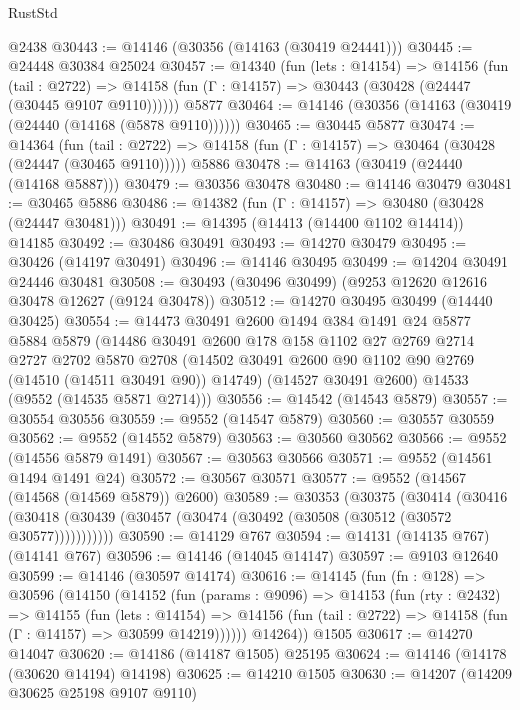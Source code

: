 \begin{lexlean}{RustStd}
\begin{coremodule}
    @2438
@30443 := @14146 (@30356 (@14163 (@30419 @24441)))
@30445 := @24448 @30384 @25024
@30457 := @14340
    (fun (lets : @14154) =>
    @14156
      (fun (tail : @2722) =>
      @14158 (fun (Γ : @14157) => @30443 (@30428 (@24447 (@30445 @9107 @9110))))))
    @5877
@30464 := @14146 (@30356 (@14163 (@30419 (@24440 (@14168 (@5878 @9110))))))
@30465 := @30445 @5877
@30474 := @14364
    (fun (tail : @2722) => @14158 (fun (Γ : @14157) => @30464 (@30428 (@24447 (@30465 @9110)))))
    @5886
@30478 := @14163 (@30419 (@24440 (@14168 @5887)))
@30479 := @30356 @30478
@30480 := @14146 @30479
@30481 := @30465 @5886
@30486 := @14382 (fun (Γ : @14157) => @30480 (@30428 (@24447 @30481)))
@30491 := @14395 (@14413 (@14400 @1102 @14414)) @14185
@30492 := @30486 @30491
@30493 := @14270 @30479
@30495 := @30426 (@14197 @30491)
@30496 := @14146 @30495
@30499 := @14204 @30491 @24446 @30481
@30508 := @30493 (@30496 @30499) (@9253 @12620 @12616 @30478 @12627 (@9124 @30478))
@30512 := @14270 @30495 @30499 (@14440 @30425)
@30554 := @14473
    @30491
    @2600
    @1494
    @384
    @1491
    @24
    @5877
    @5884
    @5879
    (@14486
      @30491
      @2600
      @178
      @158
      @1102
      @27
      @2769
      @2714
      @2727
      @2702
      @5870
      @2708
      (@14502 @30491 @2600 @90 @1102 @90 @2769 (@14510 (@14511 @30491 @90)) @14749)
      (@14527 @30491 @2600)
      @14533
      (@9552 (@14535 @5871 @2714)))
@30556 := @14542 (@14543 @5879)
@30557 := @30554 @30556
@30559 := @9552 (@14547 @5879)
@30560 := @30557 @30559
@30562 := @9552 (@14552 @5879)
@30563 := @30560 @30562
@30566 := @9552 (@14556 @5879 @1491)
@30567 := @30563 @30566
@30571 := @9552 (@14561 @1494 @1491 @24)
@30572 := @30567 @30571
@30577 := @9552 (@14567 (@14568 (@14569 @5879)) @2600)
@30589 := @30353
    (@30375
      (@30414
        (@30416 (@30418 (@30439 (@30457 (@30474 (@30492 (@30508 (@30512 (@30572 @30577)))))))))))
@30590 := @14129 @767
@30594 := @14131 (@14135 @767) (@14141 @767)
@30596 := @14146 (@14045 @14147)
@30597 := @9103 @12640
@30599 := @14146 (@30597 @14174)
@30616 := @14145
    (fun (fn : @128) =>
    @30596
      (@14150
        (@14152
          (fun (params : @9096) =>
          @14153
            (fun (rty : @2432) =>
            @14155
              (fun (lets : @14154) =>
              @14156 (fun (tail : @2722) => @14158 (fun (Γ : @14157) => @30599 @14219))))))
        @14264))
    @1505
@30617 := @14270 @14047
@30620 := @14186 (@14187 @1505) @25195
@30624 := @14146 (@14178 (@30620 @14194) @14198)
@30625 := @14210 @1505
@30630 := @14207 (@14209 @30625 @25198 @9107 @9110)

\end{coremodule}
\end{lexlean}
